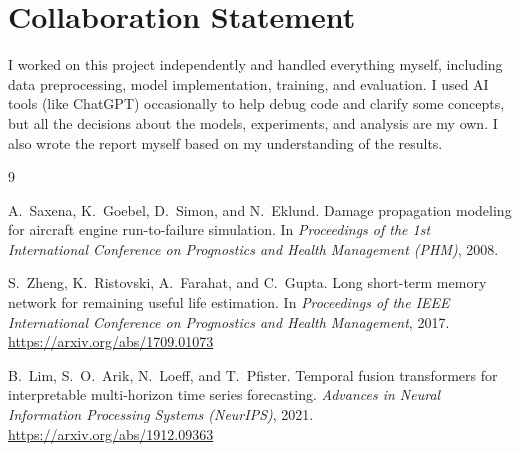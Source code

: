 \documentclass{article}
\begin{document}
\section*{Collaboration Statement}

I worked on this project independently and handled everything myself, including data preprocessing, model implementation, training, and evaluation. I used AI tools (like ChatGPT) occasionally to help debug code and clarify some concepts, but all the decisions about the models, experiments, and analysis are my own. I also wrote the report myself based on my understanding of the results.

\begin{thebibliography}{9}

A.~Saxena, K.~Goebel, D.~Simon, and N.~Eklund.
\newblock Damage propagation modeling for aircraft engine run-to-failure simulation.
\newblock In \textit{Proceedings of the 1st International Conference on Prognostics and Health Management (PHM)}, 2008.

S.~Zheng, K.~Ristovski, A.~Farahat, and C.~Gupta.
\newblock Long short-term memory network for remaining useful life estimation.
\newblock In \textit{Proceedings of the IEEE International Conference on Prognostics and Health Management}, 2017.
\newblock \url{https://arxiv.org/abs/1709.01073}

B.~Lim, S.~O.~Arik, N.~Loeff, and T.~Pfister.
\newblock Temporal fusion transformers for interpretable multi-horizon time series forecasting.
\newblock \textit{Advances in Neural Information Processing Systems (NeurIPS)}, 2021.
\newblock \url{https://arxiv.org/abs/1912.09363}

\end{thebibliography}
\end{document}
